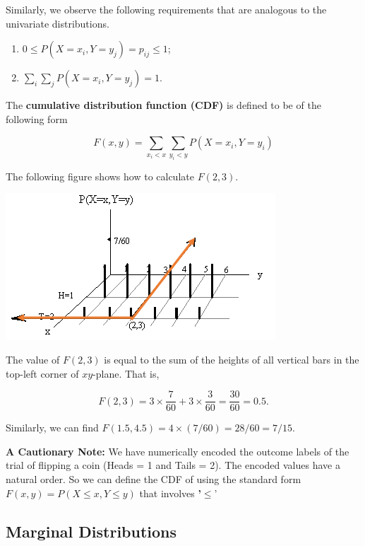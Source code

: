 \documentclass[
]{book}
\begin{document}
Similarly, we observe the following requirements that are analogous to the univariate distributions.

\begin{enumerate}
\def\labelenumi{\arabic{enumi}.}
\item
  \(0 \le P(X=x_i, Y=y_j) = p_{ij} \le 1\);
\item
  \(\sum_i\sum_j P(X=x_i, Y=y_j) = 1\).
\end{enumerate}

The \textbf{cumulative distribution function (CDF)} is defined to be of the following form

\[
F(x,y) = \sum_{x_i < x} \sum_{y_i < y} P(X=x_i, Y=y_i)
\]

The following figure shows how to calculate \(F(2,3)\).

\begin{center}\includegraphics[width=0.8\linewidth]{topic06/discreteBivariateCDF} \end{center}

The value of \(F(2,3)\) is equal to the sum of the heights of all vertical bars in the top-left corner of \(xy\)-plane. That is,

\[
F(2,3) = 3\times\frac{7}{60} + 3\times \frac{3}{60} = \frac{30}{60} = 0.5.
\]

Similarly, we can find \(F(1.5, 4.5) = 4\times (7/60) = 28/60 =7/15\).

\textbf{A Cautionary Note:} We have numerically encoded the outcome labels of the trial of flipping a coin (Heads = 1 and Tails = 2). The encoded values have a natural order. So we can define the CDF of using the standard form \(F(x,y) = P(X \le x, Y \le y )\) that involves \textbf{'}\(\le\)'

\hypertarget{marginal-distributions}{%
\subsection{Marginal Distributions}\label{marginal-distributions}}
\end{document}
